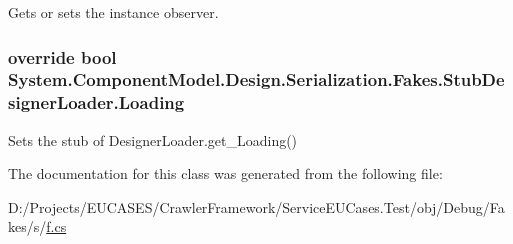 Gets or sets the instance observer.

\hypertarget{class_system_1_1_component_model_1_1_design_1_1_serialization_1_1_fakes_1_1_stub_designer_loader_a5bf21af1b99ad7e339e78047b8e363bd}{
\subsubsection[{Loading}]{\setlength{\rightskip}{0pt plus 5cm}override bool System.\-Component\-Model.\-Design.\-Serialization.\-Fakes.\-Stub\-Designer\-Loader.\-Loading\hspace{0.3cm}{\ttfamily [get]}}}\label{class_system_1_1_component_model_1_1_design_1_1_serialization_1_1_fakes_1_1_stub_designer_loader_a5bf21af1b99ad7e339e78047b8e363bd}


Sets the stub of Designer\-Loader.\-get\-\_\-\-Loading()



The documentation for this class was generated from the following file\-:\begin{DoxyCompactItemize}
\item 
D\-:/\-Projects/\-E\-U\-C\-A\-S\-E\-S/\-Crawler\-Framework/\-Service\-E\-U\-Cases.\-Test/obj/\-Debug/\-Fakes/s/\hyperlink{s_2f_8cs}{f.\-cs}\end{DoxyCompactItemize}
